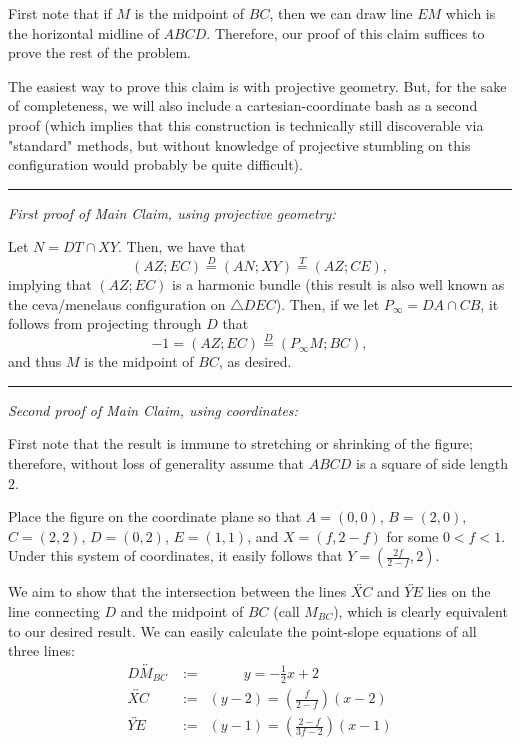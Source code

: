 \documentclass{article}
\newcommand{\V}{

\vspace{\baselineskip}

}
\begin{document}
\begin{solution}
First note that if $M$ is the midpoint of $BC$, then we can draw line $EM$ which is the horizontal midline of $ABCD$. Therefore, our proof of this claim suffices to prove the rest of the problem.\V

The easiest way to prove this claim is with projective geometry. But, for the sake of completeness, we will also include a cartesian-coordinate bash as a second proof (which implies that this construction is technically still discoverable via "standard" methods, but without knowledge of projective stumbling on this configuration would probably be quite difficult).

\vspace{0.3cm} \rule{\textwidth}{0.3pt} \vspace{0.1cm}

\textit{First proof of Main Claim, using projective geometry:}\V

Let $N = DT\cap XY$. Then, we have that 
\[(AZ;EC) \overset{D}{=} (AN; XY) \overset{T}{=} (AZ; CE),\]
implying that $(AZ;EC)$ is a harmonic bundle (this result is also well known as the ceva/menelaus configuration on $\triangle{DEC}$). Then, if we let $P_{\infty} = DA\cap CB$, it follows from projecting through $D$ that 
\[-1 = (AZ;EC) \overset{D}{=} (P_{\infty}M; BC),\]
and thus $M$ is the midpoint of $BC$, as desired.

\vspace{0.3cm} \rule{\textwidth}{0.3pt} \vspace{0.25cm}
\newpage 

\textit{Second proof of Main Claim, using coordinates:}\V

First note that the result is immune to stretching or shrinking of the figure; therefore, without loss of generality assume that $ABCD$ is a square of side length $2$.\V

Place the figure on the coordinate plane so that $A = (0,0)$, $B = (2,0)$, $C = (2,2)$, $D = (0,2)$, $E = (1,1)$, and $X = (f, 2-f)$ for some $0 < f < 1$. Under this system of coordinates, it easily follows that $Y = (\frac{2f}{2-f},2)$. \V

We aim to show that the intersection between the lines $\overleftrightarrow{XC}$ and $\overleftrightarrow{YE}$ lies on the line connecting $D$ and the midpoint of $BC$ (call $M_{BC}$), which is clearly equivalent to our desired result. We can easily calculate the point-slope equations of all three lines: 
\begin{align*}
    \overleftrightarrow{DM_{BC}} &:= \quad\qquad y = -\frac{1}{2}x+2 \tag{1}\\
    \overleftrightarrow{XC} &:= \enspace(y-2) = \left(\frac{f}{2-f}\right)(x-2) \tag{2}\\
    \overleftrightarrow{YE} &:= \enspace(y-1) = \left(\frac{2-f}{3f-2}\right)(x-1) \tag{3}
\end{align*}


\end{solution}
\end{document}
